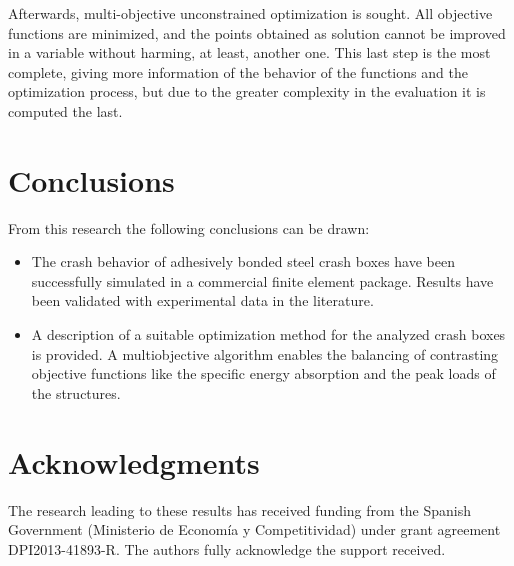 \documentclass[cmfonts]{witpress}
\begin{document}


Afterwards, multi-objective unconstrained optimization is sought. All objective functions are minimized, and the points obtained as solution cannot be improved in a variable without harming, at least, another one. This last step is the most complete, giving more information of the behavior of the functions and the optimization process, but due to the greater complexity in the evaluation it is computed the last.

\section{Conclusions}
From this research the following conclusions can be drawn:
\begin{itemize}
	\item The crash behavior of adhesively bonded steel crash boxes have been successfully simulated in a commercial finite element package. Results have been validated with experimental data in the literature.
	\item A description of a suitable optimization method for the analyzed crash boxes is provided. A multiobjective algorithm enables the balancing of contrasting objective functions like the specific energy absorption and the peak loads of the structures.
\end{itemize}

\section{Acknowledgments}
The research leading to these results has received funding from the Spanish Government (Ministerio de Economía y Competitividad) under grant agreement DPI2013-41893-R. The authors fully acknowledge the support received.


\end{document}
